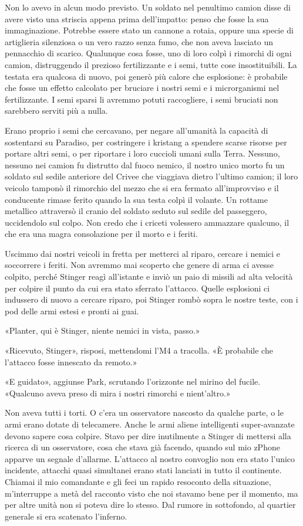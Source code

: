 Non lo avevo in alcun modo previsto. Un soldato nel penultimo camion
disse di avere visto una striscia appena prima dell'impatto: penso che
fosse la sua immaginazione. Potrebbe essere stato un cannone a rotaia,
oppure una specie di artiglieria silenziosa o un vero razzo senza fumo,
che non aveva lasciato un pennacchio di scarico. Qualunque cosa fosse,
uno di loro colpì i rimorchi di ogni camion, distruggendo il prezioso
fertilizzante e i semi, tutte cose insostituibili. La testata era
qualcosa di nuovo, poi generò più calore che esplosione: è probabile che
fosse un effetto calcolato per bruciare i nostri semi e i microrganismi
nel fertilizzante. I semi sparsi li avremmo potuti raccogliere, i semi
bruciati non sarebbero serviti più a nulla.

Erano proprio i semi che cercavano, per negare all'umanità la capacità
di sostentarsi su Paradiso, per costringere i kristang a spendere scarse
risorse per portare altri semi, o per riportare i loro cuccioli umani
sulla Terra. Nessuno, nessuno nei camion fu distrutto dal fuoco nemico,
il nostro unico morto fu un soldato sul sedile anteriore del Crivee che
viaggiava dietro l'ultimo camion; il loro veicolo tamponò il rimorchio
del mezzo che si era fermato all'improvviso e il conducente rimase
ferito quando la sua testa colpì il volante. Un rottame metallico
attraversò il cranio del soldato seduto sul sedile del passeggero,
uccidendolo sul colpo. Non credo che i criceti volessero ammazzare
qualcuno, il che era una magra consolazione per il morto e i feriti.

Uscimmo dai nostri veicoli in fretta per metterci al riparo, cercare i
nemici e soccorrere i feriti. Non avremmo mai scoperto che genere di
arma ci avesse colpito, perché Stinger reagì all'istante e inviò un paio
di missili ad alta velocità per colpire il punto da cui era stato
sferrato l'attacco. Quelle esplosioni ci indussero di nuovo a cercare
riparo, poi Stinger rombò sopra le nostre teste, con i pod delle armi
estesi e pronti ai guai.

«Planter, qui è Stinger, niente nemici in vista, passo.»

«Ricevuto, Stinger», risposi, mettendomi l'M4 a tracolla. «È probabile
che l'attacco fosse innescato da remoto.»

«E guidato», aggiunse Park, scrutando l'orizzonte nel mirino del fucile.
«Qualcuno aveva preso di mira i nostri rimorchi e nient'altro.»

Non aveva tutti i torti. O c'era un osservatore nascosto da qualche
parte, o le armi erano dotate di telecamere. Anche le armi aliene
intelligenti super-avanzate devono sapere cosa colpire. Stavo per dire
inutilmente a Stinger di mettersi alla ricerca di un osservatore, cosa
che stava già facendo, quando sul mio zPhone apparve un segnale
d'allarme. L'attacco al nostro convoglio non era stato l'unico
incidente, attacchi quasi simultanei erano stati lanciati in tutto il
continente. Chiamai il mio comandante e gli feci un rapido resoconto
della situazione, m'interruppe a metà del racconto visto che noi stavamo
bene per il momento, ma per altre unità non si poteva dire lo stesso.
Dal rumore in sottofondo, al quartier generale si era scatenato
l'inferno.

